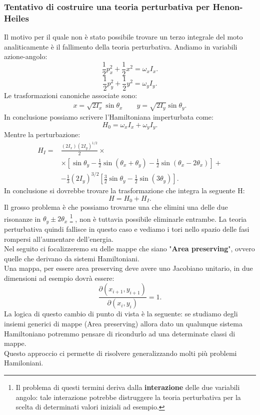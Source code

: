 \subsubsection{Tentativo di costruire una teoria perturbativa per Henon-Heiles}%
\label{subsub:Tentativo di costruire una teoria perturbativa per Henon-Heiles}
Il motivo per il quale non è stato possibile trovare un terzo integrale del moto analiticamente è il fallimento della teoria perturbativa. Andiamo in variabili azione-angolo:
\[
    \frac{1}{2}p_x^2 + \frac{1}{2}x^2 = \omega_xI_x
.\] 
\[
    \frac{1}{2}p_y^2 + \frac{1}{2}y^2 = \omega_yI_y
.\] 
Le trasformazioni canoniche associate sono:
\[\begin{aligned}
    x = \sqrt{2I_x} \sin\theta_x \qquad y = \sqrt{2I_y} \sin\theta_y
.\end{aligned}\]
In conclusione possiamo scrivere l'Hamiltoniana imperturbata come:
\[
    H_0 = \omega_xI_x + \omega_yI_y
.\] 
Mentre la perturbazione:
\[\begin{aligned}
    H_I = &\frac{(2I_x)(2I_y)^{1 /2}}{2}\times\\ 
	  &\times \left[\sin \theta_y-\frac{1}{2}\sin (\theta_x+\theta_y)-\frac{1}{2}\sin (\theta_x-2\theta_x) \right] + \\
	  & - \frac{1}{3}\left(2I_y\right)^{3 /2}\left[\frac{3}{2}\sin\theta_y-\frac{1}{2}\sin (3\theta_y)\right]
.\end{aligned}\]
In conclusione si dovrebbe trovare la trasformazione che integra la seguente H:
\[
    H = H_0+H_I
.\] 
Il grosso problema è che possiamo trovarne una che elimini una delle due risonanze in $\theta_y\pm 2\theta_x$
\footnote{Il problema di questi termini deriva dalla \textbf{interazione} delle due variabili angolo: tale interazione potrebbe distruggere la teoria perturbativa per la scelta di determinati valori iniziali ad esempio.}
, non è tuttavia possibile eliminarle entrambe. La teoria perturbativa quindi fallisce in questo caso e vediamo i tori nello spazio delle fasi rompersi all'aumentare dell'energia.\\
Nel seguito ci focalizzeremo su delle mappe che siano "\textbf{Area preserving}", ovvero quelle che derivano da sistemi Hamiltoniani.\\
Una mappa, per essere area preserving deve avere uno Jacobiano unitario, in due dimensioni ad esempio dovrà essere:
\[
    \frac{\partial (x_{i+1}, y_{i+1})}{\partial (x_i, y_i)} = 1
.\] 
La logica di questo cambio di punto di vista è la seguente: se studiamo degli insiemi generici di mappe (Area preserving) allora dato un qualunque sistema Hamiltoniano potremmo pensare di ricondurlo ad una determinate classi di mappe. \\
Questo approccio ci permette di risolvere generalizzando molti più problemi Hamiloniani.
